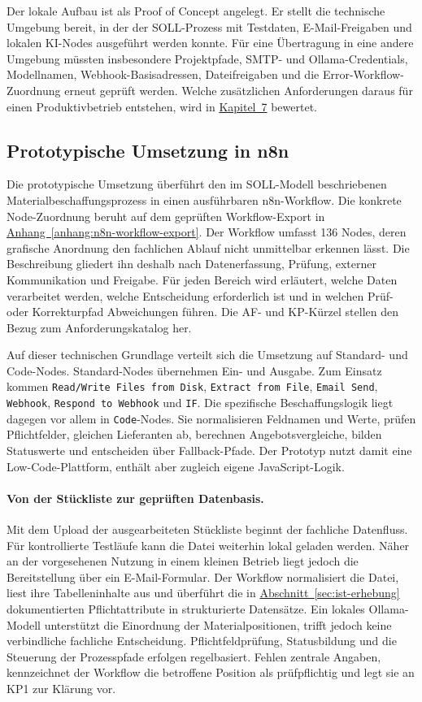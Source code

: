 \documentclass[a4paper,12pt]{article}
\begin{document}
Der lokale Aufbau ist als Proof of Concept angelegt. Er stellt die technische Umgebung bereit, in der der SOLL-Prozess mit Testdaten, E-Mail-Freigaben und lokalen KI-Nodes ausgeführt werden konnte. Für eine Übertragung in eine andere Umgebung müssten insbesondere Projektpfade, SMTP- und Ollama-Credentials, Modellnamen, Webhook-Basisadressen, Dateifreigaben und die Error-Workflow-Zuordnung erneut geprüft werden. Welche zusätzlichen Anforderungen daraus für einen Produktivbetrieb entstehen, wird in \hyperref[sec:evaluation]{Kapitel~7} bewertet.

\subsection{Prototypische Umsetzung in n8n}
Die prototypische Umsetzung überführt den im SOLL-Modell beschriebenen Materialbeschaffungsprozess in einen ausführbaren n8n-Workflow. Die konkrete Node-Zuordnung beruht auf dem geprüften Workflow-Export in \hyperref[anhang:n8n-workflow-export]{Anhang~\ref*{anhang:n8n-workflow-export}}. Der Workflow umfasst 136 Nodes, deren grafische Anordnung den fachlichen Ablauf nicht unmittelbar erkennen lässt. Die Beschreibung gliedert ihn deshalb nach Datenerfassung, Prüfung, externer Kommunikation und Freigabe. Für jeden Bereich wird erläutert, welche Daten verarbeitet werden, welche Entscheidung erforderlich ist und in welchen Prüf- oder Korrekturpfad Abweichungen führen. Die AF- und KP-Kürzel stellen den Bezug zum Anforderungskatalog her.

Auf dieser technischen Grundlage verteilt sich die Umsetzung auf Standard- und Code-Nodes. Standard-Nodes übernehmen Ein- und Ausgabe. Zum Einsatz kommen \texttt{Read/Write Files from Disk}, \texttt{Extract from File}, \texttt{Email Send}, \texttt{Webhook}, \texttt{Respond to Webhook} und \texttt{IF}. Die spezifische Beschaffungslogik liegt dagegen vor allem in \texttt{Code}-Nodes. Sie normalisieren Feldnamen und Werte, prüfen Pflichtfelder, gleichen Lieferanten ab, berechnen Angebotsvergleiche, bilden Statuswerte und entscheiden über Fallback-Pfade. Der Prototyp nutzt damit eine Low-Code-Plattform, enthält aber zugleich eigene JavaScript-Logik.

\paragraph{Von der Stückliste zur geprüften Datenbasis.}
Mit dem Upload der ausgearbeiteten Stückliste beginnt der fachliche Datenfluss. Für kontrollierte Testläufe kann die Datei weiterhin lokal geladen werden. Näher an der vorgesehenen Nutzung in einem kleinen Betrieb liegt jedoch die Bereitstellung über ein E-Mail-Formular. Der Workflow normalisiert die Datei, liest ihre Tabelleninhalte aus und überführt die in \hyperref[sec:ist-erhebung]{Abschnitt~\ref*{sec:ist-erhebung}} dokumentierten Pflichtattribute in strukturierte Datensätze. Ein lokales Ollama-Modell unterstützt die Einordnung der Materialpositionen, trifft jedoch keine verbindliche fachliche Entscheidung. Pflichtfeldprüfung, Statusbildung und die Steuerung der Prozesspfade erfolgen regelbasiert. Fehlen zentrale Angaben, kennzeichnet der Workflow die betroffene Position als prüfpflichtig und legt sie an KP1 zur Klärung vor.
\end{document}
